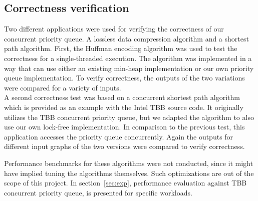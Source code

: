 \subsection{Correctness verification}
\label{subsec:corr_ver}
Two different applications were used for verifying the correctness of our concurrent priority queue.
A lossless data compression algorithm and a shortest path algorithm. 
First, the Huffman encoding algorithm was used to test the correctness for a single-threaded execution. The algorithm was implemented in a way that can use either an existing min-heap implementation or our own priority queue implementation.
To verify correctness, the outputs of the two variations were compared for a variety of inputs.\\
A second correctness test was based on a concurrent shortest path algorithm which is provided as an example with the Intel TBB source code.
It originally utilizes the TBB concurrent priority queue, but we adapted the algorithm to also use our own lock-free implementation.
In comparison to the previous test, this application accesses the priority queue concurrently.
Again the outputs for different input graphs of the two versions were compared to verify correctness.

Performance benchmarks for these algorithms were not conducted, since it might have implied tuning the algorithms themselves.
Such optimizations are out of the scope of this project.
In section~\ref{sec:exp}, performance evaluation against TBB concurrent priority queue, is presented for specific workloads.

